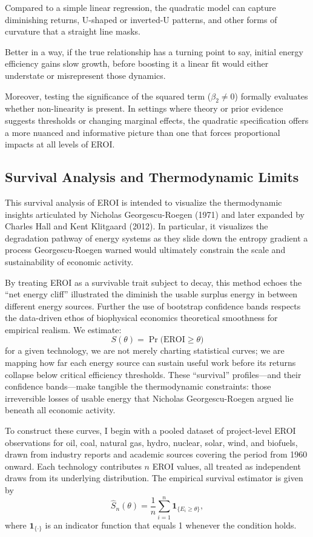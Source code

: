 \documentclass[a4paper,12pt]{article}
\begin{document}
Compared to a simple linear regression, the quadratic model can capture diminishing returns, U-shaped or inverted-U patterns, and other forms of curvature that a straight line masks. 

Better in a way, if the true relationship has a turning point to say, initial energy efficiency gains slow growth, before boosting it a linear fit would either understate or misrepresent those dynamics. 

Moreover, testing the significance of the squared term ($\beta_{2} \neq 0$) formally evaluates whether non-linearity is present. In settings where theory or prior evidence suggests thresholds or changing marginal effects, the quadratic specification offers a more nuanced and informative picture than one that forces proportional impacts at all levels of EROI.

\subsection{Survival Analysis and Thermodynamic Limits}

This survival analysis of EROI is intended to visualize the thermodynamic insights articulated by Nicholas Georgescu-Roegen (1971) and later expanded by Charles Hall and Kent Klitgaard (2012). In particular, it visualizes the degradation pathway of energy systems as they slide down the entropy gradient a process Georgescu-Roegen warned would ultimately constrain the scale and sustainability of economic activity.

By treating EROI as a survivable trait subject to decay, this method echoes the “net energy cliff” illustrated the diminish the usable surplus energy in between different energy sources. Further the use of  bootstrap confidence bands respects the data-driven ethos of biophysical economics theoretical smoothness for empirical realism.
We estimate:
\[
    S(\theta) = \Pr\bigl(\mathrm{EROI} \ge \theta\bigr)
\]
for a given technology, we are not merely charting statistical curves; we are mapping how far each energy source can sustain useful work before its returns collapse below critical efficiency thresholds. These ``survival'' profiles—and their confidence bands—make tangible the thermodynamic constraints: those irreversible losses of usable energy that Nicholas Georgescu-Roegen argued lie beneath all economic activity.

To construct these curves, I begin with a pooled dataset of project-level EROI observations for oil, coal, natural gas, hydro, nuclear, solar, wind, and biofuels, drawn from industry reports and academic sources covering the period from 1960 onward. Each technology contributes $n$ EROI values, all treated as independent draws from its underlying distribution. The empirical survival estimator is given by
\[
    \widehat{S}_{n}(\theta) = \frac{1}{n} \sum_{i=1}^{n} \mathbf{1}_{\{E_i \ge \theta\}},
\]
where $\mathbf{1}_{\{\cdot\}}$ is an indicator function that equals 1 whenever the condition holds.
\end{document}
